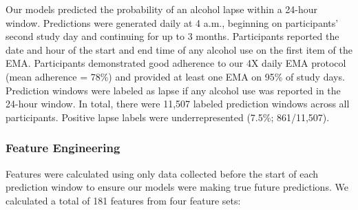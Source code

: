\documentclass[
  letterpaper,
  DIV=11,
  numbers=noendperiod]{scrartcl}
\begin{document}
Our models predicted the probability of an alcohol lapse within a
24-hour window. Predictions were generated daily at 4 a.m., beginning on
participants' second study day and continuing for up to 3 months.
Participants reported the date and hour of the start and end time of any
alcohol use on the first item of the EMA. Participants demonstrated good
adherence to our 4X daily EMA protocol (mean adherence = 78\%) and
provided at least one EMA on 95\% of study days. Prediction windows were
labeled as lapse if any alcohol use was reported in the 24-hour window.
In total, there were 11,507 labeled prediction windows across all
participants. Positive lapse labels were underrepresented (7.5\%;
861/11,507).

\subsubsection{Feature Engineering}\label{feature-engineering}

Features were calculated using only data collected before the start of
each prediction window to ensure our models were making true future
predictions. We calculated a total of 181 features from four feature
sets:
\end{document}
